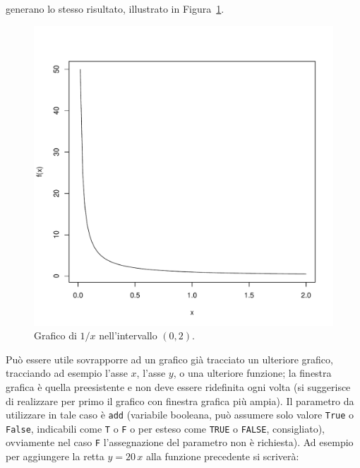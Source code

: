 \documentclass[onecolumn,11pt]{book}\usepackage[]{graphicx}\usepackage[]{color}
\makeatletter
\def\maxwidth{ %
  \ifdim\Gin@nat@width>\linewidth
    \linewidth
  \else
    \Gin@nat@width
  \fi
}
\newenvironment{knitrout}{}{} %
\makeatother
\begin{document}
\begin{itemize}
generano  lo stesso risultato, illustrato in Figura~\ref{grafounox}.\vskip5pt
\begin{figure}[htbp]
\begin{center}
\begin{knitrout}
\color{fgcolor}
\includegraphics[width=\maxwidth]{figure/unnamed-chunk-69-1} 

\end{knitrout}
\caption{Grafico di $1/x$ nell'intervallo $(0,2)$.}
\label{grafounox}
\end{center}
\end{figure}

Pu\`o essere utile sovrapporre ad un grafico gi\`a tracciato un ulteriore grafico, tracciando ad esempio l'asse $x$, l'asse $y$, o una ulteriore funzione;  la finestra grafica \`e quella preesistente e non deve essere ridefinita ogni volta (si suggerisce di realizzare per primo il grafico con finestra grafica pi\`u ampia). Il parametro da utilizzare in tale caso \`e \texttt{add} (variabile booleana, pu\`o assumere solo valore \texttt{True} o \texttt{False}, indicabili come \texttt{T}  o \texttt{F} o per esteso come \texttt{TRUE}  o \texttt{FALSE}, consigliato), ovviamente nel caso \texttt{F} l'assegnazione del parametro non \`e richiesta). Ad esempio per aggiungere la retta $y=20\,x$ alla funzione precedente si scriver\`a:%


\end{itemize}
\end{document}
